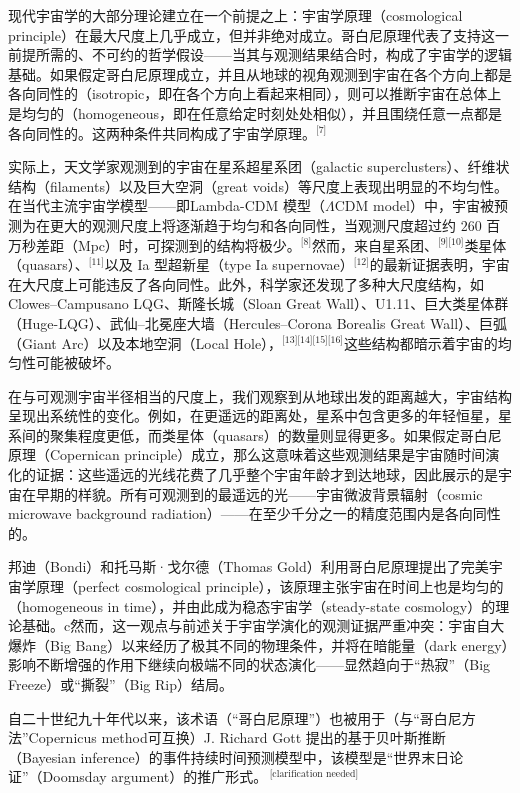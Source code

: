现代宇宙学的大部分理论建立在一个前提之上：宇宙学原理（cosmological principle）在最大尺度上几乎成立，但并非绝对成立。哥白尼原理代表了支持这一前提所需的、不可约的哲学假设——当其与观测结果结合时，构成了宇宙学的逻辑基础。如果假定哥白尼原理成立，并且从地球的视角观测到宇宙在各个方向上都是各向同性的（isotropic，即在各个方向上看起来相同），则可以推断宇宙在总体上是均匀的（homogeneous，即在任意给定时刻处处相似），并且围绕任意一点都是各向同性的。这两种条件共同构成了宇宙学原理。\(^\text{[7]}\)

实际上，天文学家观测到的宇宙在星系超星系团（galactic superclusters）、纤维状结构（filaments）以及巨大空洞（great voids）等尺度上表现出明显的不均匀性。在当代主流宇宙学模型——即Lambda-CDM 模型（$\Lambda$CDM model）中，宇宙被预测为在更大的观测尺度上将逐渐趋于均匀和各向同性，当观测尺度超过约 $260$ 百万秒差距（$\mathrm{Mpc}$）时，可探测到的结构将极少。\(^\text{[8]}\)然而，来自星系团、\(^\text{[9][10]}\)类星体（quasars）、\(^\text{[11]}\)以及 Ia 型超新星（type Ia supernovae）\(^\text{[12]}\)的最新证据表明，宇宙在大尺度上可能违反了各向同性。此外，科学家还发现了多种大尺度结构，如 Clowes–Campusano LQG、斯隆长城（Sloan Great Wall）、U1.11、巨大类星体群（Huge-LQG）、武仙–北冕座大墙（Hercules–Corona Borealis Great Wall）、巨弧（Giant Arc）以及本地空洞（Local Hole），\(^\text{[13][14][15][16]}\)这些结构都暗示着宇宙的均匀性可能被破坏。

在与可观测宇宙半径相当的尺度上，我们观察到从地球出发的距离越大，宇宙结构呈现出系统性的变化。例如，在更遥远的距离处，星系中包含更多的年轻恒星，星系间的聚集程度更低，而类星体（quasars）的数量则显得更多。如果假定哥白尼原理（Copernican principle）成立，那么这意味着这些观测结果是宇宙随时间演化的证据：这些遥远的光线花费了几乎整个宇宙年龄才到达地球，因此展示的是宇宙在早期的样貌。所有可观测到的最遥远的光——宇宙微波背景辐射（cosmic microwave background radiation）——在至少千分之一的精度范围内是各向同性的。

邦迪（Bondi）和托马斯·戈尔德（Thomas Gold）利用哥白尼原理提出了完美宇宙学原理（perfect cosmological principle），该原理主张宇宙在时间上也是均匀的（homogeneous in time），并由此成为稳态宇宙学（steady-state cosmology）的理论基础。c然而，这一观点与前述关于宇宙学演化的观测证据严重冲突：宇宙自大爆炸（Big Bang）以来经历了极其不同的物理条件，并将在暗能量（dark energy）影响不断增强的作用下继续向极端不同的状态演化——显然趋向于“热寂”（Big Freeze）或“撕裂”（Big Rip）结局。

自二十世纪九十年代以来，该术语（“哥白尼原理”）也被用于（与“哥白尼方法”Copernicus method可互换）J. Richard Gott 提出的基于贝叶斯推断（Bayesian inference）的事件持续时间预测模型中，该模型是“世界末日论证”（Doomsday argument）的推广形式。\,\(^\text{[clarification needed]}\)

